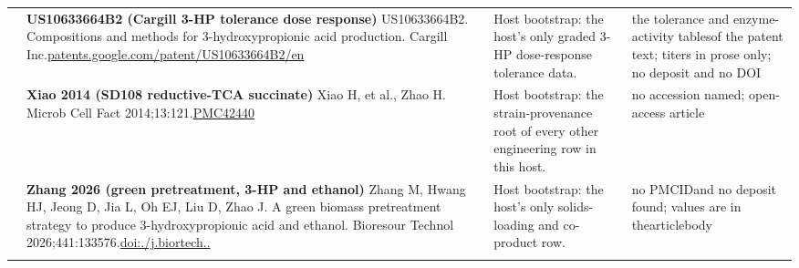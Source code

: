 \begin{landscape}
\begin{longtable}{@{}r@{\hspace{4pt}} L{78mm} L{72mm} L{76mm}@{}}
 & \textbf{US10633664B2 (Cargill 3-HP tolerance dose response)} \newline US10633664B2. Compositions and methods for 3-hydroxypropionic acid production. Cargill Inc.\newline \href{https://patents.google.com/patent/US10633664B2/en}{patents.\allowbreak google.\allowbreak com/\allowbreak patent/\allowbreak US10633\allowbreak 664B2/\allowbreak en} & Host bootstrap: the host's only graded 3-HP dose-response tolerance data. & the tole\allowbreak rance an\allowbreak d enzyme\allowbreak -\allowbreak activit\allowbreak y tables\allowbreak  of the \allowbreak patent t\allowbreak ext; tit\allowbreak ers in p\allowbreak rose onl\allowbreak y; no de\allowbreak posit an\allowbreak d no DOI \\
 & \textbf{Xiao 2014 (SD108 reductive-TCA succinate)} \newline Xiao H, et al., Zhao H. Microb Cell Fact 2014;13:121.\newline \href{https://pmc.ncbi.nlm.nih.gov/articles/PMC4244060}{PMC42440} & Host bootstrap: the strain-provenance root of every other engineering row in this host. & no acces\allowbreak sion nam\allowbreak ed; open\allowbreak -\allowbreak access \allowbreak article \\
 & \textbf{Zhang 2026 (green pretreatment, 3-HP and ethanol)} \newline Zhang M, Hwang HJ, Jeong D, Jia L, Oh EJ, Liu D, Zhao J. A green biomass pretreatment strategy to produce 3-hydroxypropionic acid and ethanol. Bioresour Technol 2026;441:133576.\newline \href{https://doi.org/10.1016/j.biortech.2025.133576}{doi:./\allowbreak j.\allowbreak biortec\allowbreak h..} & Host bootstrap: the host's only solids-loading and co-product row. & no PMCID\allowbreak  and no \allowbreak deposit \allowbreak found; v\allowbreak alues ar\allowbreak e in the\allowbreak  article\allowbreak  body \\
\addlinespace[5pt]

\end{longtable}
\end{landscape}

